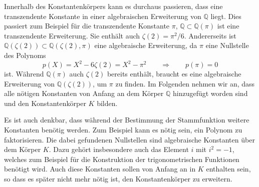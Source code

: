 Innerhalb des Konstantenkörpers kann es durchaus passieren, dass eine
transzendente Konstante in einer algebraischen Erweiterung von
$\mathbb{Q}$ liegt.
Dies passiert zum Beispiel für die transzendente Konstante $\pi$,
$\mathbb{Q}\subset \mathbb{Q}(\pi)$ ist eine transzendente Erweiterung.
Sie enthält auch $\zeta(2) = \pi^2/6$.
Andererseits ist $\mathbb{Q}(\zeta(2)) \subset \mathbb{Q}(\zeta(2),\pi)$
eine algebraische Erweiterung, da $\pi$ eine Nullstelle des Polynoms
\[
p(X)
=
X^2 - 6\zeta(2)
=
X^2 - \pi^2
\qquad
\Rightarrow
\qquad
p(\pi)=0
\]
ist.
Während $\mathbb{Q}(\pi)$ auch $\zeta(2)$ bereits enthält, braucht
es eine algebraische Erweiterung von $\mathbb{Q}(\zeta(2))$, um $\pi$
zu finden.
Im Folgenden nehmen wir an, dass alle nötigen Konstanten von Anfang
an dem Körper $\mathbb{Q}$ hinzugefügt worden sind und den Konstantenkörper
$K$ bilden.

Es ist auch denkbar, dass während der Bestimmung der Stammfunktion weitere
Konstanten benötig werden. 
Zum Beispiel kann es nötig sein, ein Polynom zu faktorisieren.
Die dabei gefundenen Nullstellen sind algebraische Konstanten über
dem Körper $K$.
Dazu gehört insbesondere auch das Element $i$ mit $i^2=-1$, welches
zum Beispiel für die Konstruktion der trigonometrischen Funktionen
benötigt wird.
Auch diese Konstanten sollen von Anfang an in $K$ enthalten sein, so
dass es später nicht mehr nötig ist, den Konstantenkörper zu erweitern.

